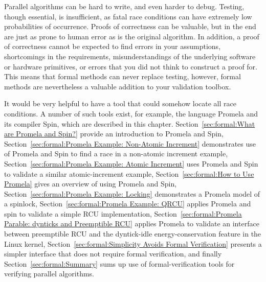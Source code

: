


Parallel algorithms can be hard to write, and even harder to debug.
Testing, though essential, is insufficient, as fatal race conditions
can have extremely low probabilities of occurrence.
Proofs of correctness can be valuable, but in the end are just as
prone to human error as is the original algorithm.
In addition, a proof of correctness cannot be expected to find errors
in your assumptions, shortcomings in the requirements,
misunderstandings of the underlying software or hardware primitives,
or errors that you did not think to construct a proof for.
This means that formal methods can never replace testing, however,
formal methods are nevertheless a valuable addition to your validation toolbox.

It would be very helpful to have a tool that could somehow locate
all race conditions.
A number of such tools exist, for example,
the language Promela and its compiler Spin, which are described in
this chapter.
Section~\ref{sec:formal:What are Promela and Spin?} provide an
introduction to Promela and Spin,
Section~\ref{sec:formal:Promela Example: Non-Atomic Increment}
demonstrates use of Promela and Spin to find a race in a non-atomic increment
example,
Section~\ref{sec:formal:Promela Example: Atomic Increment}
uses Promela and Spin to validate a similar atomic-increment example,
Section~\ref{sec:formal:How to Use Promela}
gives an overview of using Promela and Spin,
Section~\ref{sec:formal:Promela Example: Locking}
demonstrates a Promela model of a spinlock,
Section~\ref{sec:formal:Promela Example: QRCU}
applies Promela and spin to validate a simple RCU implementation,
Section~\ref{sec:formal:Promela Parable: dynticks and Preemptible RCU}
applies Promela to validate an interface between preemptible RCU and
the dyntick-idle energy-conservation feature in the Linux kernel,
Section~\ref{sec:formal:Simplicity Avoids Formal Verification}
presents a simpler interface that does not require formal verification,
and finally
Section~\ref{sec:formal:Summary}
sums up use of formal-verification tools for verifying parallel algorithms.





